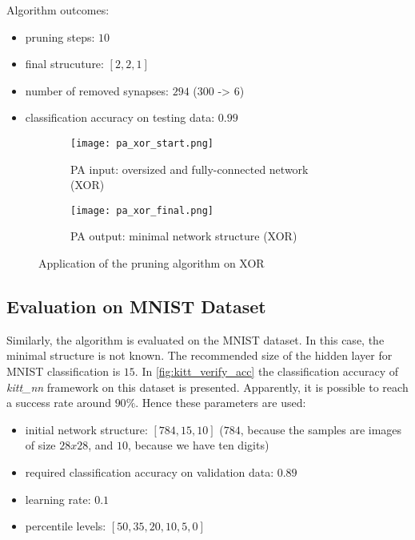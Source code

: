 Algorithm outcomes:
\begin{itemize}
\item pruning steps: $ 10 $
\item final strucuture: $ [2, 2, 1] $
\item number of removed synapses: $ 294 $ ($ 300 $ -> $ 6 $)
\item classification accuracy on testing data: $ 0.99 $
\end{itemize}

\begin{figure}[H]
\centering
\begin{subfigure}{0.45\textwidth}
  \centering
  \texttt{[image: pa\_xor\_start.png]}
  \caption{PA input: oversized and fully-connected network (XOR)}
  \label{img:pa_xor_start}
\end{subfigure}%
\begin{subfigure}{0.45\textwidth}
  \centering
  \texttt{[image: pa\_xor\_final.png]}
  \caption{PA output: minimal network structure (XOR)}
  \label{img:pa_xor_final}
\end{subfigure}
\caption{Application of the pruning algorithm on XOR}
\label{img:pa_xor_morph}
\end{figure}

\subsection{Evaluation on MNIST Dataset} \label{ssec:evaluation_on_mnist}
Similarly, the algorithm is evaluated on the MNIST dataset. In this case, the minimal structure is not known. The recommended size of the hidden layer for MNIST classification is $ 15 $. In \cref{fig:kitt_verify_acc} the classification accuracy of \textit{kitt\_nn} framework on this dataset is presented. Apparently, it is possible to reach a success rate around $ 90\% $. Hence these parameters are used:

\begin{itemize}
\item initial network structure: $ [784, 15, 10] $ ($ 784 $, because the samples are images of size $ 28x28 $, and $ 10 $, because we have ten digits)
\item required classification accuracy on validation data: $ 0.89 $
\item learning rate: $ 0.1 $
\item percentile levels: $ [50, 35, 20, 10, 5, 0] $
\end{itemize}

